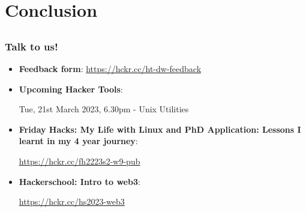\documentclass[12pt]{beamer}
\begin{document}
\section{Conclusion}
\subsection{}
\begin{frame}
  \frametitle{Talk to us!}
  \begin{itemize}
    \item \textbf{Feedback form}: \url{https://hckr.cc/ht-dw-feedback}
    \item \textbf{Upcoming Hacker Tools}:

          Tue, 21st March 2023, 6.30pm - Unix Utilities

    \item \textbf{Friday Hacks: My Life with Linux and PhD Application: Lessons I learnt in my 4 year journey}:

          \url{https://hckr.cc/fh2223s2-w9-pub}

    \item \textbf{Hackerschool: Intro to web3}: 

           \url{https://hckr.cc/hs2023-web3}
  \end{itemize}
\end{frame}
\end{document}
